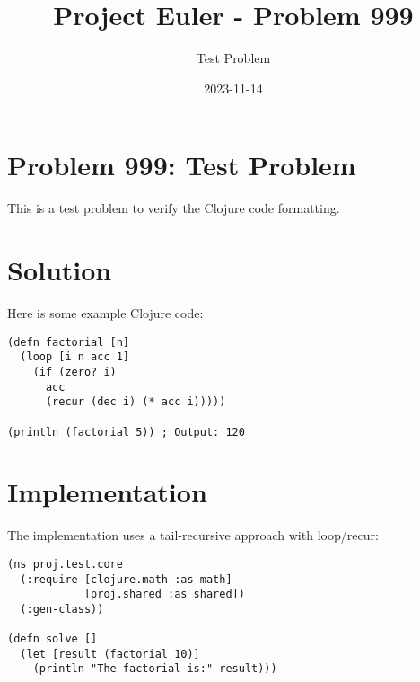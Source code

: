 \documentclass{article}
\title{Project Euler - Problem 999}
\author{Test Problem}
\date{2023-11-14}
\begin{document}
\maketitle

\section*{Problem 999: Test Problem}

This is a test problem to verify the Clojure code formatting.

\section*{Solution}

Here is some example Clojure code:

\begin{lstlisting}
(defn factorial [n]
  (loop [i n acc 1]
    (if (zero? i)
      acc
      (recur (dec i) (* acc i)))))
      
(println (factorial 5)) ; Output: 120
\end{lstlisting}

\section*{Implementation}

The implementation uses a tail-recursive approach with loop/recur:

\begin{lstlisting}
(ns proj.test.core
  (:require [clojure.math :as math]
            [proj.shared :as shared])
  (:gen-class))

(defn solve []
  (let [result (factorial 10)]
    (println "The factorial is:" result)))
\end{lstlisting}
\end{document}
